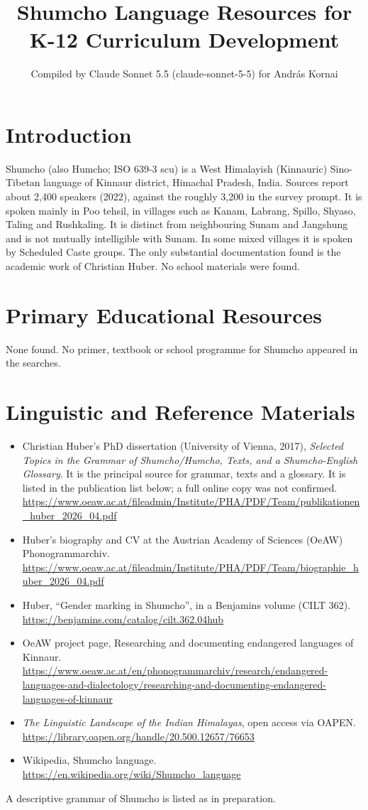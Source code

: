\documentclass[12pt]{article}
\title{Shumcho Language Resources for K-12 Curriculum Development}
\author{Compiled by Claude Sonnet 5.5 (claude-sonnet-5-5) for Andr\'as Kornai}
\date{}
\begin{document}
\maketitle

\section{Introduction}
Shumcho (also Humcho; ISO 639-3 scu) is a West Himalayish (Kinnauric) Sino-Tibetan language of Kinnaur district, Himachal Pradesh, India. Sources report about 2,400 speakers (2022), against the roughly 3,200 in the survey prompt. It is spoken mainly in Poo tehsil, in villages such as Kanam, Labrang, Spillo, Shyaso, Taling and Rushkaling. It is distinct from neighbouring Sunam and Jangshung and is not mutually intelligible with Sunam. In some mixed villages it is spoken by Scheduled Caste groups. The only substantial documentation found is the academic work of Christian Huber. No school materials were found.

\section{Primary Educational Resources}
None found. No primer, textbook or school programme for Shumcho appeared in the searches.

\section{Linguistic and Reference Materials}
\begin{itemize}
\item Christian Huber's PhD dissertation (University of Vienna, 2017), \emph{Selected Topics in the Grammar of Shumcho/Humcho, Texts, and a Shumcho-English Glossary}. It is the principal source for grammar, texts and a glossary. It is listed in the publication list below; a full online copy was not confirmed. \url{https://www.oeaw.ac.at/fileadmin/Institute/PHA/PDF/Team/publikationen_huber_2026_04.pdf}
\item Huber's biography and CV at the Austrian Academy of Sciences (OeAW) Phonogrammarchiv. \url{https://www.oeaw.ac.at/fileadmin/Institute/PHA/PDF/Team/biographie_huber_2026_04.pdf}
\item Huber, ``Gender marking in Shumcho'', in a Benjamins volume (CILT 362). \url{https://benjamins.com/catalog/cilt.362.04hub}
\item OeAW project page, Researching and documenting endangered languages of Kinnaur. \url{https://www.oeaw.ac.at/en/phonogrammarchiv/research/endangered-languages-and-dialectology/researching-and-documenting-endangered-languages-of-kinnaur}
\item \emph{The Linguistic Landscape of the Indian Himalayas}, open access via OAPEN. \url{https://library.oapen.org/handle/20.500.12657/76653}
\item Wikipedia, Shumcho language. \url{https://en.wikipedia.org/wiki/Shumcho_language}
\end{itemize}
A descriptive grammar of Shumcho is listed as in preparation.
\end{document}
